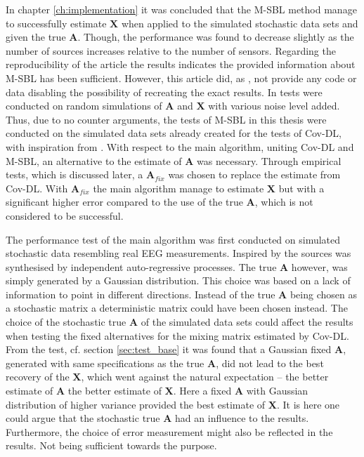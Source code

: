 In chapter \ref{ch:implementation} it was concluded that the M-SBL method manage to successfully estimate $\textbf{X}$ when applied to the simulated stochastic data sets and given the true $\textbf{A}$. Though, the performance was found to decrease slightly as the number of sources increases relative to the number of sensors. 
Regarding the reproducibility of the article \cite{Balkan2014} the results indicates the provided information about M-SBL has been sufficient.
However, this article did, as \cite{Balkan2015}, not provide any code or data disabling the possibility of recreating the exact results. In \cite{Balkan2014} tests were conducted on random simulations of $\textbf{A}$ and $\textbf{X}$ with various noise level added. 
Thus, due to no counter arguments, the tests of M-SBL in this thesis were conducted on the simulated data sets already created for the tests of Cov-DL, with inspiration from \cite{Balkan2014}.
With respect to the main algorithm, uniting Cov-DL and M-SBL, an alternative to the estimate of $\textbf{A}$ was necessary. 
Through empirical tests, which is discussed later, a $\textbf{A}_{fix}$ was chosen to replace the estimate from Cov-DL. 
With $\textbf{A}_{fix}$ the main algorithm manage to estimate $\textbf{X}$ but with a significant higher error compared to the use of the true $\textbf{A}$, which is not considered to be successful.

The performance test of the main algorithm was first conducted on simulated stochastic data resembling real EEG measurements. 
Inspired by \cite{Balkan2015} the sources was synthesised by independent auto-regressive processes. 
The true $\textbf{A}$ however, was simply generated by a Gaussian distribution. 
This choice was based on a lack of information to point in different directions. 
Instead of the true $\textbf{A}$ being chosen as a stochastic matrix a deterministic matrix could have been chosen instead. 
The choice of the stochastic true $\textbf{A}$ of the simulated data sets could affect the results when testing the fixed alternatives for the mixing matrix estimated by Cov-DL. 
From the test, cf. section \ref{sec:test_base} it was found that a Gaussian fixed $\textbf{A}$, generated with same specifications as the true $\textbf{A}$, did not lead to the best recovery of the $\textbf{X}$, which went against the natural expectation -- the better estimate of $\textbf{A}$ the better estimate of $\textbf{X}$. Here a fixed $\textbf{A}$ with Gaussian distribution of higher variance provided the best estimate of $\textbf{X}$. It is here one could argue that the stochastic true $\textbf{A}$ had an influence to the results. 
Furthermore, the choice of error measurement might also be reflected in the results. Not being sufficient towards the purpose. 

